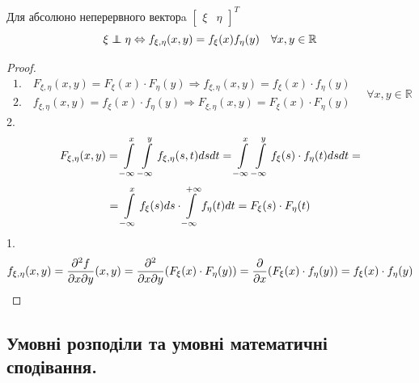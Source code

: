 
\begin{boxteo}Для абсолюно неперервного векторa $\begin{bmatrix}
	 \xi& \eta
	\end{bmatrix}^T$\\
$$\xi \independent \eta \Leftrightarrow f_{\xi, \eta} (x,y)= f_{\xi}(x) f_{\eta}(y) \quad \forall x,y \in \mathbb{R}$$
\end{boxteo}

\begin{proof}
$$
\begin{gathered}
1. \quad  F_{\xi, \eta} (x,y) = F_{\xi}(x) \cdot F_{\eta}(y) \Longrightarrow f_{\xi, \eta} (x,y) = f_{\xi}(x) \cdot f_{\eta}(y)\\
	2. \quad f_{\xi, \eta} (x,y) = f_{\xi}(x) \cdot f_{\eta}(y)\Longrightarrow F_{\xi, \eta} (x,y) = F_{\xi}(x) \cdot F_{\eta}(y)
\end{gathered}\quad \forall x,y \in \mathbb{R}
$$
2.
$$
F_{\xi, \eta} (x,y ) =  \int\limits_{-\infty}^{ x}{  \int\limits_{- \infty}^{y}{ f_{\xi, \eta} (s,t) dsdt}} =  \int\limits_{- \infty}^{ x}{  \int\limits_{-\infty}^{y}{ f_{\xi} (s) \cdot f_{\eta} (t)dsdt}} =
$$
$$
= \int\limits_{-\infty}^{ x}{ f_ \xi (s) ds}\cdot  \int\limits_{-\infty}^{ +\infty}{f_\eta(t) dt} = F_{\xi}(s)\cdot F_{\eta}(t)
$$
1.
$$
f_{\xi, \eta} (x,y) = \frac{\partial^2 f}{\partial x \partial y} (x,y) = \frac{\partial ^2}{\partial x \partial y} (F_{\xi}(x) \cdot F_{ \eta} (y) ) = \frac{\partial}{\partial x} (F_{\xi} (x) \cdot f_{\eta} (y) ) = f_{\xi}(x) \cdot f_{\eta}(y)
$$
\end{proof}

\subsection{Умовні розподіли та умовні математичні сподівання.}

